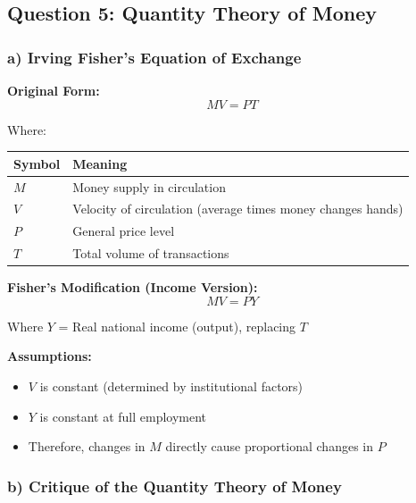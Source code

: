 \documentclass[12pt,a4paper]{article}
\begin{document}

\subsection{Question 5: Quantity Theory of Money}

\subsubsection*{a) Irving Fisher's Equation of Exchange}

\textbf{Original Form:}
\begin{equation}
MV = PT
\end{equation}

Where:
\begin{center}
\begin{tabular}{@{}p{2cm}p{12cm}@{}}
\toprule
\textbf{Symbol} & \textbf{Meaning} \\
\midrule
$M$ & Money supply in circulation \\
$V$ & Velocity of circulation (average times money changes hands) \\
$P$ & General price level \\
$T$ & Total volume of transactions \\
\bottomrule
\end{tabular}
\end{center}

\textbf{Fisher's Modification (Income Version):}
\begin{equation}
MV = PY
\end{equation}

Where $Y$ = Real national income (output), replacing $T$

\textbf{Assumptions:}
\begin{itemize}
    \item $V$ is constant (determined by institutional factors)
    \item $Y$ is constant at full employment
    \item Therefore, changes in $M$ directly cause proportional changes in $P$
\end{itemize}

\subsubsection*{b) Critique of the Quantity Theory of Money}
\end{document}
